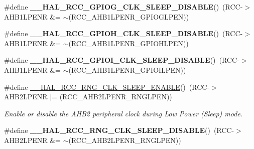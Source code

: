 \begin{DoxyCompactItemize}
\item 
\mbox{\label{group___r_c_c_ex___peripheral___clock___sleep___enable___disable_ga296c8414e577cab553cc903752315a88}} 
\#define {\bfseries \+\_\+\+\_\+\+H\+A\+L\+\_\+\+R\+C\+C\+\_\+\+G\+P\+I\+O\+G\+\_\+\+C\+L\+K\+\_\+\+S\+L\+E\+E\+P\+\_\+\+D\+I\+S\+A\+B\+LE}()~(R\+CC-\/$>$A\+H\+B1\+L\+P\+E\+NR \&= $\sim$(R\+C\+C\+\_\+\+A\+H\+B1\+L\+P\+E\+N\+R\+\_\+\+G\+P\+I\+O\+G\+L\+P\+EN))
\item 
\mbox{\label{group___r_c_c_ex___peripheral___clock___sleep___enable___disable_ga3150a9552cca2ec7e0f00d799fc52adb}} 
\#define {\bfseries \+\_\+\+\_\+\+H\+A\+L\+\_\+\+R\+C\+C\+\_\+\+G\+P\+I\+O\+H\+\_\+\+C\+L\+K\+\_\+\+S\+L\+E\+E\+P\+\_\+\+D\+I\+S\+A\+B\+LE}()~(R\+CC-\/$>$A\+H\+B1\+L\+P\+E\+NR \&= $\sim$(R\+C\+C\+\_\+\+A\+H\+B1\+L\+P\+E\+N\+R\+\_\+\+G\+P\+I\+O\+H\+L\+P\+EN))
\item 
\mbox{\label{group___r_c_c_ex___peripheral___clock___sleep___enable___disable_ga5cbe09217a8512d6a29763cb3e387607}} 
\#define {\bfseries \+\_\+\+\_\+\+H\+A\+L\+\_\+\+R\+C\+C\+\_\+\+G\+P\+I\+O\+I\+\_\+\+C\+L\+K\+\_\+\+S\+L\+E\+E\+P\+\_\+\+D\+I\+S\+A\+B\+LE}()~(R\+CC-\/$>$A\+H\+B1\+L\+P\+E\+NR \&= $\sim$(R\+C\+C\+\_\+\+A\+H\+B1\+L\+P\+E\+N\+R\+\_\+\+G\+P\+I\+O\+I\+L\+P\+EN))
\item 
\#define \mbox{\hyperlink{group___r_c_c_ex___peripheral___clock___sleep___enable___disable_ga03ec704e7309312630b3a572fb6f8856}{\+\_\+\+\_\+\+H\+A\+L\+\_\+\+R\+C\+C\+\_\+\+R\+N\+G\+\_\+\+C\+L\+K\+\_\+\+S\+L\+E\+E\+P\+\_\+\+E\+N\+A\+B\+LE}}()~(R\+CC-\/$>$A\+H\+B2\+L\+P\+E\+NR $\vert$= (R\+C\+C\+\_\+\+A\+H\+B2\+L\+P\+E\+N\+R\+\_\+\+R\+N\+G\+L\+P\+EN))
\begin{DoxyCompactList}\small\item\em Enable or disable the A\+H\+B2 peripheral clock during Low Power (Sleep) mode. \end{DoxyCompactList}\item 
\mbox{\label{group___r_c_c_ex___peripheral___clock___sleep___enable___disable_gae85e4ea41a2b365ee27c459ddcb9a3a1}} 
\#define {\bfseries \+\_\+\+\_\+\+H\+A\+L\+\_\+\+R\+C\+C\+\_\+\+R\+N\+G\+\_\+\+C\+L\+K\+\_\+\+S\+L\+E\+E\+P\+\_\+\+D\+I\+S\+A\+B\+LE}()~(R\+CC-\/$>$A\+H\+B2\+L\+P\+E\+NR \&= $\sim$(R\+C\+C\+\_\+\+A\+H\+B2\+L\+P\+E\+N\+R\+\_\+\+R\+N\+G\+L\+P\+EN))

\end{DoxyCompactItemize}
